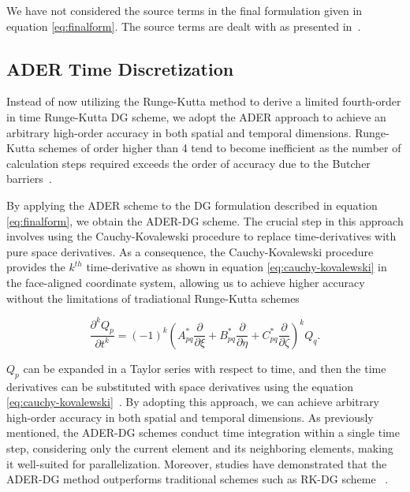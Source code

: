 \par We have not considered the source terms in the final formulation given in equation \ref{eq:finalform}. The source terms are dealt with as presented in~\parencite{10.1785/0120060253}.

\subsection[ADER Time Discretization]{ADER Time Discretization}

Instead of now utilizing the Runge-Kutta method to derive a limited fourth-order in time Runge-Kutta \ac{DG} scheme, we adopt the 
\ac{ADER} approach to achieve an arbitrary high-order accuracy in both spatial and temporal dimensions. Runge-Kutta schemes of order
higher than 4 tend to become inefficient as the number of calculation steps required exceeds the order of accuracy due to the Butcher barriers~\parencite{butcher1987numerical}.

\par By applying the \ac{ADER} scheme to the \ac{DG} formulation described in equation \ref{eq:finalform}, we obtain the \ac{ADER}-\ac{DG} scheme.
The crucial step in this approach involves using the Cauchy-Kovalewski procedure to replace time-derivatives with pure space derivatives.
As a consequence, the Cauchy-Kovalewski procedure provides the $k^{th}$ time-derivative as shown in equation \ref{eq:cauchy-kovalewski} in the face-aligned coordinate system, allowing us to
achieve higher accuracy without the limitations of tradiational Runge-Kutta schemes

\begin{equation}
    \frac{\partial^k Q_p}{\partial t^k} = \left(-1\right)^k \left(A_{pq}^* \frac{\partial}{\partial \xi} + B_{pq}^* \frac{\partial}{\partial \eta} + C_{pq}^* \frac{\partial}{\partial \zeta}\right)^k Q_q .
    \label{eq:cauchy-kovalewski}
\end{equation}

$Q_p$ can be expanded in a Taylor series with respect to time, and then the time derivatives can be substituted with space derivatives
using the equation \ref{eq:cauchy-kovalewski}~\parencite[Sec. 3.2]{dumbser1}. By adopting this approach, we can achieve arbitrary high-order
accuracy in both spatial and temporal dimensions. As previously mentioned, the \ac{ADER}-\ac{DG} schemes conduct time integration
within a single time step, considering only the current element and its neighboring elements, making it well-suited for parallelization.
Moreover, studies have demonstrated that the \ac{ADER}-\ac{DG} method outperforms traditional schemes such as \ac{RK-DG} scheme ~\parencite{dumbser2005ader}.
